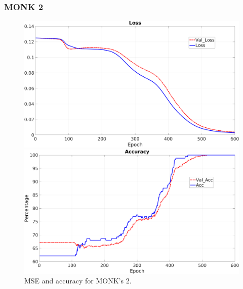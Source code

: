 \subsubsection{MONK 2}
\begin{figure}[H]
    \centering
    \begin{minipage}[t]{0.5\linewidth}
        \includegraphics[width=\linewidth]{img/Monk2_loss.png}
    \end{minipage}%
    \begin{minipage}[t]{0.5\linewidth}
        \includegraphics[width=\linewidth]{img/Monk2_accuracy.png}
    \end{minipage}
    \caption{MSE and accuracy for MONK’s 2.}
\end{figure}

